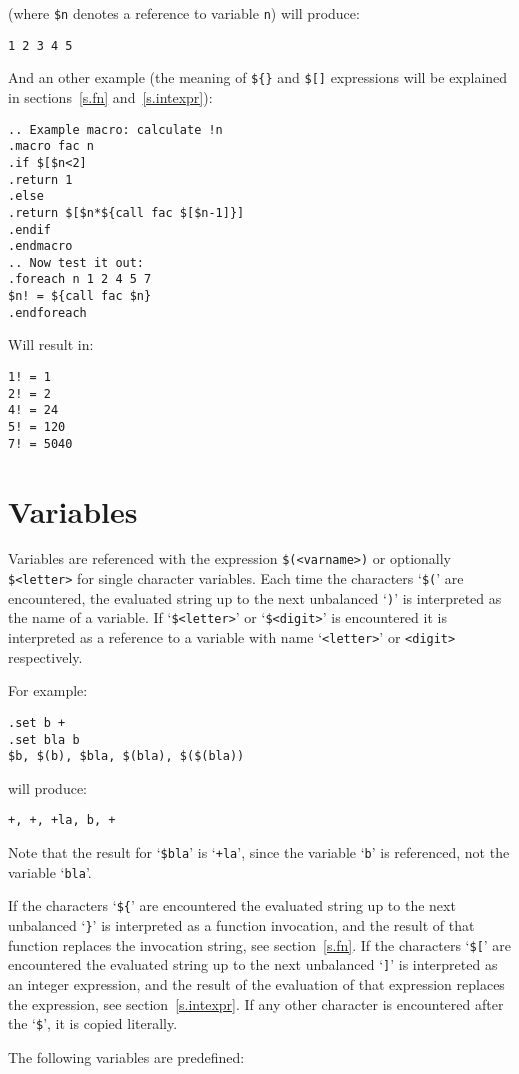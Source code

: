 (where \verb+$n+ denotes a reference to variable \verb+n+) will produce:
\begin{verbatim}
1 2 3 4 5
\end{verbatim}
And an other example (the meaning of \verb+${}+ and \verb+$[]+ expressions
will be explained in sections~\ref{s.fn} and~\ref{s.intexpr}):
\begin{verbatim}
.. Example macro: calculate !n
.macro fac n
.if $[$n<2]
.return 1
.else
.return $[$n*${call fac $[$n-1]}]
.endif
.endmacro
.. Now test it out:
.foreach n 1 2 4 5 7
$n! = ${call fac $n}
.endforeach
\end{verbatim}
Will result in:
\begin{verbatim}
1! = 1
2! = 2
4! = 24
5! = 120
7! = 5040
\end{verbatim}
\section{Variables}
Variables are referenced with the expression
{\tt \$(<varname>)} or optionally {\tt \$<letter>} for single character
variables.
Each time the characters `{\tt \$(}' are encountered,
the evaluated string up to the next unbalanced `{\tt )}' 
is interpreted as the name of a variable.
If `{\tt \$<letter>}' or `{\tt \$<digit>}' is encountered it is interpreted as
a reference to a variable with name `{\tt <letter>}' or {\tt <digit>}
respectively.
\par
For example:
\begin{verbatim}
.set b +
.set bla b
$b, $(b), $bla, $(bla), $($(bla))
\end{verbatim}
will produce:
\begin{verbatim}
+, +, +la, b, +
\end{verbatim}
Note that the result for `\verb+$bla+' is `{\tt +la}', since the
variable `{\tt b}' is referenced, not the variable `{\tt bla}'.
\par
If the characters `{\tt \$\{}' are encountered the evaluated string up to
the next unbalanced `{\tt \}}' is interpreted as a function invocation,
and the result of that function replaces the invocation string,
see section~\ref{s.fn}.
If the characters `{\tt \$[}' are encountered the evaluated string up
to the next unbalanced `{\tt ]}' is interpreted as an integer expression,
and the result of the evaluation of that expression replaces the expression,
see section~\ref{s.intexpr}.
If any other character is encountered after the `{\tt \$}',
it is copied literally.
\par
The following variables are predefined:
